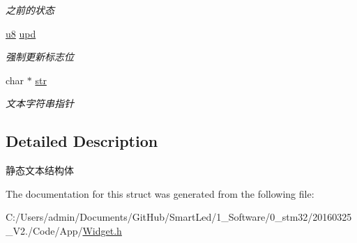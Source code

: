 \begin{DoxyCompactItemize}
\begin{DoxyCompactList}\small\item\em 之前的状态 \end{DoxyCompactList}\item 
\hypertarget{struct_s_t_r___text_a70f704b92411670f99563a59c6f9a4b5}{\hyperlink{group___b_s_p_gaed742c436da53c1080638ce6ef7d13de}{u8} \hyperlink{struct_s_t_r___text_a70f704b92411670f99563a59c6f9a4b5}{upd}}\label{struct_s_t_r___text_a70f704b92411670f99563a59c6f9a4b5}

\begin{DoxyCompactList}\small\item\em 强制更新标志位 \end{DoxyCompactList}\item 
\hypertarget{struct_s_t_r___text_ab50d783982593ef993ea0b68f7ad8b80}{char $\ast$ \hyperlink{struct_s_t_r___text_ab50d783982593ef993ea0b68f7ad8b80}{str}}\label{struct_s_t_r___text_ab50d783982593ef993ea0b68f7ad8b80}

\begin{DoxyCompactList}\small\item\em 文本字符串指针 \end{DoxyCompactList}\end{DoxyCompactItemize}


\subsection{\-Detailed \-Description}
静态文本结构体 

\-The documentation for this struct was generated from the following file\-:\begin{DoxyCompactItemize}
\item 
\-C\-:/\-Users/admin/\-Documents/\-Git\-Hub/\-Smart\-Led/1\-\_\-\-Software/0\-\_\-stm32/20160325\-\_\-\-V2./\-Code/\-App/\hyperlink{_widget_8h}{\-Widget.\-h}\end{DoxyCompactItemize}
